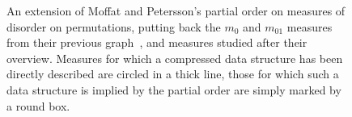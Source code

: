 \begin{figure}
\caption{An extension of Moffat and Petersson's partial order \cite{1992-ACJ-AnOverviewOfAdaptiveSorting-MoffatPetersson} on measures of disorder on permutations, putting back the $m_0$ and $m_{01}$ measures from their previous graph~\cite{1995-DAM-AFrameworkForAdaptiveSorting-PeterssonMoffat}, and measures studied after their overview. Measures for which a compressed data structure has been directly described are \cite{2013-IanFest-FromTimeToSpace-Barbay,2013-TCS-CompressedRepresentationsOfPermutationsAndApplications-BarbayNavarro,2010-ISAAC-AlphabetPartitioningForCompressedRankSelectAndApplications-BarbayGagieNavarroNekrich,2014-Algorithmica-EfficientFullyCompressedSequenceRepresentations-BarbayClaudeGagieNavarroNekrich} circled in a thick line, those for which such a data structure is implied by the partial order are simply marked by a round box.}
\label{fig:MeasuresOfDisorder}
\end{figure}

